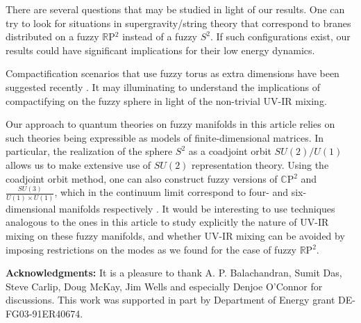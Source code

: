 \documentclass[a4paper,12pt]{article}
\numberwithin{equation}{section}
\begin{document}
There are several questions that may be studied in light of our
results. One can try to look for situations in supergravity/string
theory that correspond to branes distributed on a fuzzy ${\mathbb
R}$P$^2$ instead of a fuzzy $S^2$. If such configurations exist, our
results could have significant implications for their low energy
dynamics.

Compactification scenarios that use fuzzy torus as extra dimensions
have been suggested recently \cite{gomewi}. It may illuminating to
understand the implications of compactifying on the fuzzy sphere in
light of the non-trivial UV-IR mixing.

Our approach to quantum theories on fuzzy manifolds in this article
relies on such theories being expressible as models of
finite-dimensional matrices. In particular, the realization of the
sphere $S^2$ as a coadjoint orbit $SU(2)/U(1)$ allows us to make
extensive use of $SU(2)$ representation theory. Using the coadjoint
orbit method, one can also construct fuzzy versions of ${\mathbb
C}$P$^2$ and $\frac{SU(3)}{U(1) \times U(1)}$, which in the continuum
limit correspond to four- and six-dimensional manifolds respectively
\cite{trivai}. It would be interesting to use techniques analogous to
the ones in this article to study explicitly the nature of UV-IR
mixing on these fuzzy manifolds, and whether UV-IR mixing can be
avoided by imposing restrictions on the modes as we found for the case
of fuzzy ${\mathbb R}$P$^2$.

{\bf Acknowledgments:} It is a pleasure to thank A. P. Balachandran,
Sumit Das, Steve Carlip, Doug McKay, Jim Wells and especially Denjoe
O'Connor for discussions.  This work was supported in part by
Department of Energy grant DE-FG03-91ER40674.




\end{document}
